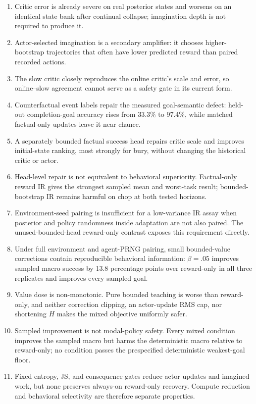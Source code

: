 \documentclass[10pt]{article}
\newcommand{\pct}[1]{#1\%}
\begin{document}
\begin{enumerate}
  \item Critic error is already severe on real posterior states and worsens on an identical state bank after continual collapse; imagination depth is not required to produce it.
  \item Actor-selected imagination is a secondary amplifier: it chooses higher-bootstrap trajectories that often have lower predicted reward than paired recorded actions.
  \item The slow critic closely reproduces the online critic's scale and error, so online--slow agreement cannot serve as a safety gate in its current form.
  \item Counterfactual event labels repair the measured goal-semantic defect: held-out completion-goal accuracy rises from \pct{33.3} to \pct{97.4}, while matched factual-only updates leave it near chance.
  \item A separately bounded factual success head repairs critic scale and improves initial-state ranking, most strongly for bury, without changing the historical critic or actor.
  \item Head-level repair is not equivalent to behavioral superiority. Factual-only reward IR gives the strongest sampled mean and worst-task result; bounded-bootstrap IR remains harmful on chop at both tested horizons.
  \item Environment-seed pairing is insufficient for a low-variance IR assay when posterior and policy randomness inside adaptation are not also paired. The unused-bounded-head reward-only contrast exposes this requirement directly.
  \item Under full environment and agent-PRNG pairing, small bounded-value corrections contain reproducible behavioral information: $\beta=.05$ improves sampled macro success by 13.8 percentage points over reward-only in all three replicates and improves every sampled goal.
  \item Value dose is non-monotonic. Pure bounded teaching is worse than reward-only, and neither correction clipping, an actor-update RMS cap, nor shortening $H$ makes the mixed objective uniformly safer.
  \item Sampled improvement is not modal-policy safety. Every mixed condition improves the sampled macro but harms the deterministic macro relative to reward-only; no condition passes the prespecified deterministic weakest-goal floor.
  \item Fixed entropy, JS, and consequence gates reduce actor updates and imagined work, but none preserves always-on reward-only recovery. Compute reduction and behavioral selectivity are therefore separate properties.

\end{enumerate}
\end{document}
